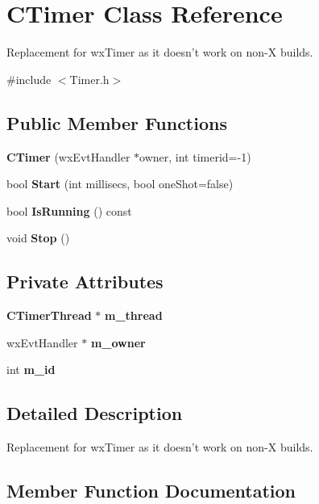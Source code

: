 \section{CTimer Class Reference}
\label{classCTimer}


Replacement for wxTimer as it doesn't work on non-\/X builds.  


{\ttfamily \#include $<$Timer.h$>$}\subsection*{Public Member Functions}
\begin{DoxyCompactItemize}
\item 
{\bfseries CTimer} (wxEvtHandler $\ast$owner, int timerid=-\/1)\label{classCTimer_afa82f0b33dd6b7de68899da3fe999078}

\item 
bool {\bf Start} (int millisecs, bool oneShot=false)
\item 
bool {\bf IsRunning} () const \label{classCTimer_a0afb7b2e8a9e6bd268d601a93a066a68}

\item 
void {\bf Stop} ()
\end{DoxyCompactItemize}
\subsection*{Private Attributes}
\begin{DoxyCompactItemize}
\item 
{\bf CTimerThread} $\ast$ {\bfseries m\_\-thread}\label{classCTimer_a4fa00153d88b21ab7f79c0796caec132}

\item 
wxEvtHandler $\ast$ {\bfseries m\_\-owner}\label{classCTimer_aea085bb7c42fb73d55d6f1c1a8568ee1}

\item 
int {\bfseries m\_\-id}\label{classCTimer_a01b725c49d2a9129bc465b6f92e39402}

\end{DoxyCompactItemize}


\subsection{Detailed Description}
Replacement for wxTimer as it doesn't work on non-\/X builds. 

\subsection{Member Function Documentation}
